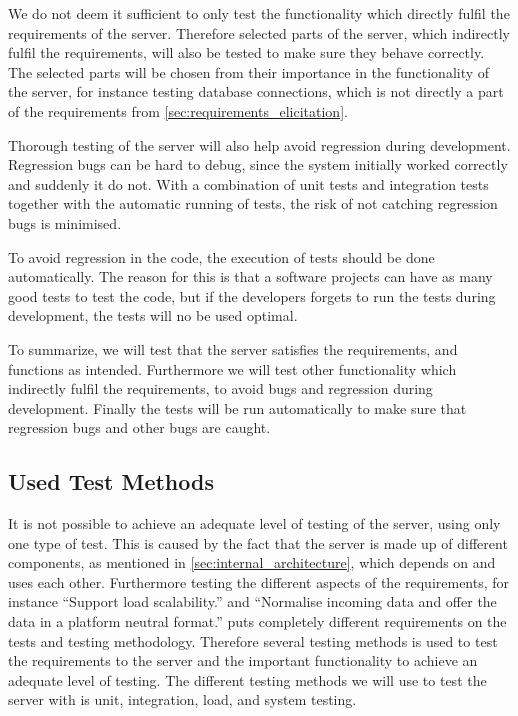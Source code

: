 We do not deem it sufficient to only test the functionality which directly fulfil the requirements of the server.
Therefore selected parts of the server, which indirectly fulfil the requirements, 
will also be tested to make sure they behave correctly.
The selected parts will be chosen from their importance in the functionality of the server,
for instance testing database connections, 
which is not directly a part of the requirements from \cref{sec:requirements_elicitation}.


Thorough testing of the server will also help avoid regression during development.
Regression bugs can be hard to debug, since the system initially worked correctly and suddenly it do not.
With a combination of unit tests and integration tests together with the automatic running of tests,
the risk of not catching regression bugs is minimised\cite{regression}.

To avoid regression in the code, the execution of tests should be done automatically.
The reason for this is that a software projects can have as many good tests to test the code,
but if the developers forgets to run the tests during development,
the tests will no be used optimal.

\bigskip
To summarize, we will test that the server satisfies the requirements,
and functions as intended. 
Furthermore we will test other functionality which indirectly fulfil the requirements,
to avoid bugs and regression during development.
Finally the tests will be run automatically to make sure that regression bugs and other bugs are caught.

\subsection{Used Test Methods}
It is not possible to achieve an adequate level of testing of the server, using only one type of test.
This is caused by the fact that the server is made up of different components, 
as mentioned in \cref{sec:internal_architecture}, 
which depends on and uses each other.
Furthermore testing the different aspects of the requirements, for instance ``Support load scalability.'' 
and ``Normalise incoming data and offer the data in a platform neutral format.'' puts completely different
requirements on the tests and testing methodology.
Therefore several testing methods is used to test the requirements to the server 
and the important functionality to achieve an adequate level of testing.
The different testing methods we will use to test the server with is unit, integration, load, and system testing.

